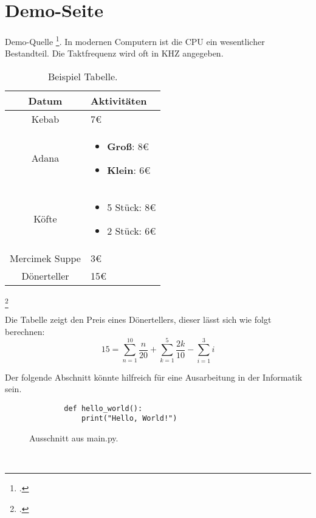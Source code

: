\section{Demo-Seite}
Demo-Quelle \footcite[Vgl.][]{DemoQuelle}. 
In modernen Computern ist die \ac{CPU} ein wesentlicher Bestandteil. Die Taktfrequenz wird oft in \ac{KHZ} angegeben.

\begin{center}
    \begin{table}[h]
    \centering
    \begin{tabular}{|c|p{6cm}|}
        \hline
        \textbf{Datum} & \textbf{Aktivitäten} \\
        \hline
        Kebab & 7€ \\
        \hline
        Adana & \begin{itemize}
            \item \textbf{Groß}: 8€
            \item \textbf{Klein}: 6€
        \end{itemize} \\
        \hline
        Köfte & \begin{itemize}
            \item 5 Stück: 8€
            \item 2 Stück: 6€
        \end{itemize}\\
        \hline
        Mercimek Suppe & 3€ \\
        \hline
        Dönerteller & 15€ \\
        \hline
    \end{tabular}
    \caption{Beispiel Tabelle.\footnotemark}%
    \label{tab:example}
    \end{table}
\end{center}
\footcitetext[Vgl.][]{DemoQuelle}

Die Tabelle zeigt den Preis eines Dönertellers, dieser lässt sich wie folgt berechnen:
\begin{equation}
    15 = \sum_{n=1}^{10} \frac{n}{20} + \sum_{k=1}^{5} \frac{2k}{10} - \sum_{i=1}^{3} i
\end{equation}

\newpage
Der folgende Abschnitt könnte hilfreich für eine Ausarbeitung in der Informatik sein.
\begin{figure}[h]
    \begin{lstlisting}
        def hello_world():
            print("Hello, World!")
    \end{lstlisting}
    \caption{Ausschnitt aus main.py.\footnotemark}%
    \label{fig:meincode}
\end{figure}
\\

